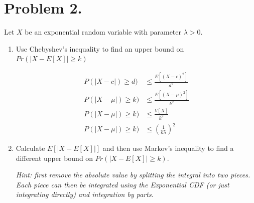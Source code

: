 \documentclass{article}
\newcommand{\1}{\mathbf{1}}
\begin{document}
\section*{Problem 2.}
Let $X$ be an exponential random variable with parameter $\lambda > 0$.
\begin{enumerate}
    \item Use Chebyshev's inequality to find an upper bound on $Pr(|X- E[X] | \geq k)$

    \begin{align*}
        P(|X-c|) \geq d) &\leq \frac{E[(X-c)^2]}{d^2} \\
        P(|X-\mu|) \geq k) &\leq \frac{E[(X-\mu)^2]}{k^2} \\
        P(|X-\mu|) \geq k) &\leq \frac{V[X]}{k^2} \\
        P(|X-\mu|) \geq k) &\leq \left(\frac{1}{k\lambda}\right)^2
    \end{align*}

    \item Calculate $E[ |X - E[X]|]$ and then use Markov's inequality to find a different upper bound on $Pr(|X- E[X] | \geq k)$.\par
    {\it Hint: first remove the absolute value by splitting the integral into two pieces. Each piece can then be integrated using the Exponential CDF (or just integrating directly) and integration by parts.}
    

\end{enumerate}
\end{document}
